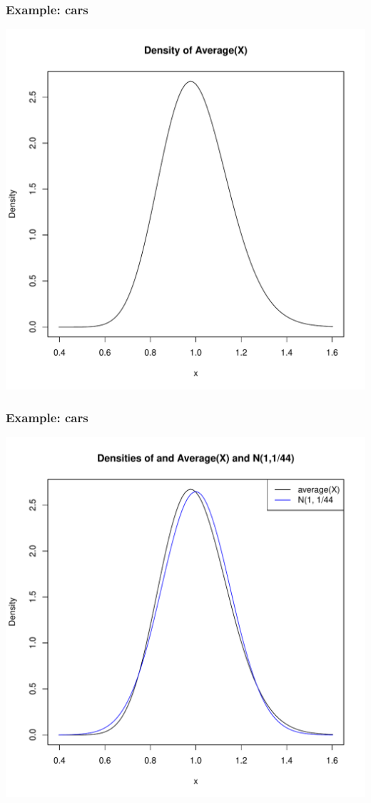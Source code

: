 \documentclass[handout]{beamer}\usepackage[]{graphicx}\usepackage[]{color}
\newenvironment{knitrout}{}{} %
\numberwithin{equation}{section}
\begin{document}
\begin{frame}[fragile]
\frametitle{Example: cars}
\begin{knitrout}
\color{fgcolor}
\includegraphics[width=.8\textwidth,height=.8\textheight]{figure/unnamed-chunk-3-1} 

\end{knitrout}
\end{frame}

\begin{frame}[fragile]
\frametitle{Example: cars}
\begin{knitrout}
\color{fgcolor}
\includegraphics[width=.8\textwidth,height=.8\textheight]{figure/unnamed-chunk-4-1} 

\end{knitrout}
\end{frame}
\end{document}
